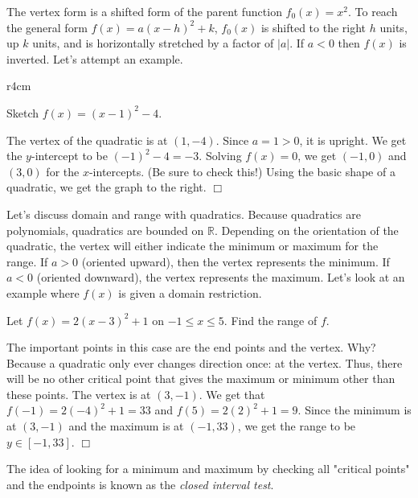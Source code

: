 \documentclass[lang=en,11pt]{elegantbook}
\begin{document}
The vertex form is a shifted form of the parent function $f_0(x)=x^2$.  To reach the general form $f(x)=a(x-h)^2+k$, $f_0(x)$ is shifted to the right $h$ units, up $k$ units, and is horizontally stretched by a factor of $|a|$.  If $a<0$ then $f(x)$ is inverted.  Let's attempt an example.
\begin{wrapfigure}{r}{4cm}
\end{wrapfigure}
\begin{example}
Sketch $f(x)=(x-1)^2-4$.
\end{example}
\begin{solution}
The vertex of the quadratic is at $(1,-4)$.  Since $a=1>0$, it is upright.  We get the $y$-intercept to be $(-1)^2-4=-3$.  Solving $f(x)=0$, we get $(-1,0)$ and $(3,0)$ for the $x$-intercepts.  (Be sure to check this!)  Using the basic shape of a quadratic, we get the graph to the right.  $\Box$
\end{solution}
Let's discuss domain and range with quadratics.  Because quadratics are polynomials, quadratics are bounded on $\mathbb{R}$.  Depending on the orientation of the quadratic, the vertex will either indicate the minimum or maximum for the range.  If $a>0$ (oriented upward), then the vertex represents the minimum.  If $a<0$ (oriented downward), the vertex represents the maximum.  Let's look at an example where $f(x)$ is given a domain restriction.
\begin{example}
Let $f(x)=2(x-3)^2+1$ on $-1\leq x\leq 5$.  Find the range of $f$.
\end{example}
\begin{solution}
The important points in this case are the end points and the vertex.  Why?  Because a quadratic only ever changes direction once: at the vertex.  Thus, there will be no other critical point that gives the maximum or minimum other than these points.  The vertex is at $(3,-1)$.  We get that $f(-1)=2(-4)^2+1=33$ and $f(5)=2(2)^2+1=9$.  Since the minimum is at $(3,-1)$ and the maximum is at $(-1,33)$, we get the range to be $y\in[-1,33]$.  $\Box$
\end{solution}
\begin{remark}
  The idea of looking for a minimum and maximum by checking all "critical points" and the endpoints is known as the \textit{closed interval test}.
\end{remark}
\end{document}
